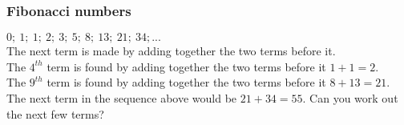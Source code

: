 \subsubsection*{Fibonacci numbers}
$0;~1;~1;~2;~3;~5;~8;~13;~21;~34;...$\\
The next term is made by adding together the two terms before it.\\
The $4^{th}$ term is found by adding together the two terms before it $1+1=2$.\\
The $9^{th}$ term is found by adding together the two terms before it $8+13=21$.\\
The next term in the sequence above would be $21+34=55$.
Can you work out the next few terms?


